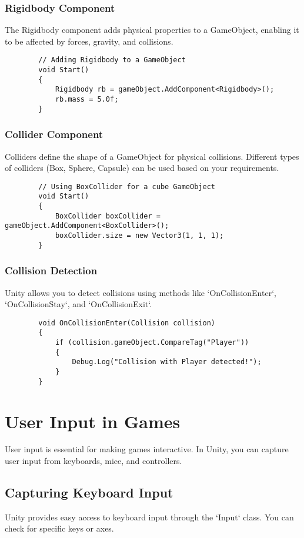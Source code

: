 \documentclass[a4paper,12pt]{book}
\begin{document}
	\subsection{Rigidbody Component}
	The Rigidbody component adds physical properties to a GameObject, enabling it to be affected by forces, gravity, and collisions.
	
	\begin{lstlisting}
		// Adding Rigidbody to a GameObject
		void Start()
		{
			Rigidbody rb = gameObject.AddComponent<Rigidbody>();
			rb.mass = 5.0f;
		}
	\end{lstlisting}
	
	\subsection{Collider Component}
	Colliders define the shape of a GameObject for physical collisions. Different types of colliders (Box, Sphere, Capsule) can be used based on your requirements.
	
	\begin{lstlisting}
		// Using BoxCollider for a cube GameObject
		void Start()
		{
			BoxCollider boxCollider = gameObject.AddComponent<BoxCollider>();
			boxCollider.size = new Vector3(1, 1, 1);
		}
	\end{lstlisting}
	
	\subsection{Collision Detection}
	Unity allows you to detect collisions using methods like `OnCollisionEnter`, `OnCollisionStay`, and `OnCollisionExit`.
	
	\begin{lstlisting}
		void OnCollisionEnter(Collision collision)
		{
			if (collision.gameObject.CompareTag("Player"))
			{
				Debug.Log("Collision with Player detected!");
			}
		}
	\end{lstlisting}
	
	\chapter{User Input in Games}
	User input is essential for making games interactive. In Unity, you can capture user input from keyboards, mice, and controllers.
	
	\section{Capturing Keyboard Input}
	Unity provides easy access to keyboard input through the `Input` class. You can check for specific keys or axes.
	
\end{document}
